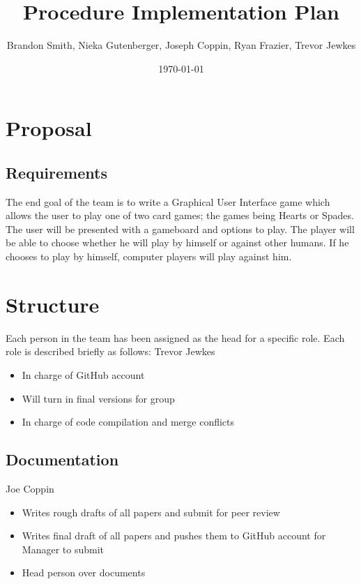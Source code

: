 \documentclass[11pt, titlepage]{article}
\author{Brandon Smith, Nieka Gutenberger, Joseph Coppin, Ryan Frazier, Trevor Jewkes}
\title{Procedure Implementation Plan}
\date{\today}
\begin{document}
	\maketitle
    \setcounter{tocdepth}{1}
\section{Proposal}

    \subsection{Requirements}

    The end goal of the team is to write a Graphical User Interface game which allows the user to play one of two card games; the games being Hearts or Spades.  The user will be presented with a gameboard and options to play. The player will be able to choose whether he will play by himself or against other humans.  If he chooses to play by himself, computer players will play against him.

    \section{Structure}
    	Each person in the team has been assigned as the head for a specific role. Each role is described briefly as follows:
	    Trevor Jewkes
    	\begin{itemize}
    		\item In charge of GitHub account
    		\item Will turn in final versions for group
    		\item In charge of code compilation and merge conflicts
    	\end{itemize}

    \subsection{Documentation}
	    Joe Coppin
    	\begin{itemize}
    		\item Writes rough drafts of all papers and submit for peer review
    		\item Writes final draft of all papers and pushes them to GitHub account for Manager to submit
    		\item Head person over documents
    	\end{itemize}
\end{document}
